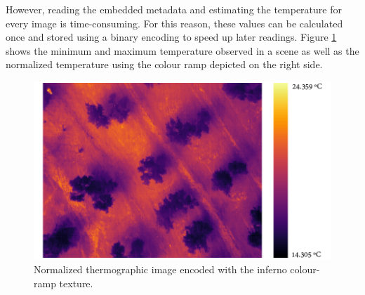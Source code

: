 \vspace{3mm}



However, reading the embedded metadata and estimating the temperature for every image is time-consuming. For this reason, these values can be calculated once and stored using a binary encoding to speed up later readings. Figure \ref{fig:thermal_inferno_temperature} shows the minimum and maximum temperature observed in a scene as well as the normalized temperature using the colour ramp depicted on the right side.

\begin{figure}[ht]
	\centering
	\includegraphics[width=\linewidth]{figs/materials/thermal_inferno_temperature.png}
	\caption{Normalized thermographic image encoded with the inferno colour-ramp texture. }
	\label{fig:thermal_inferno_temperature}
\end{figure}

